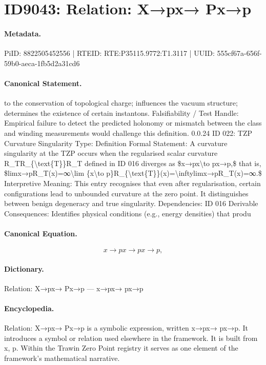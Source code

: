 \section*{ID9043: Relation: X→px→ Px→p}
\paragraph{Metadata.}
PiID: 8822505452556 | RTEID: RTE:P35115.9772:T1.3117 | UUID: 555cf67a-656f-59b0-aeca-1fb5d2a31cd6

\paragraph{Canonical Statement.}
to the conservation of topological charge; influences the vacuum structure; determines the existence of certain instantons. Falsifiability / Test Handle: Empirical failure to detect the predicted holonomy or mismatch between the class and winding measurements would challenge this definition. 0.0.24 ID 022: TZP Curvature Singularity Type: Definition Formal Statement: A curvature singularity at the TZP occurs when the regularised scalar curvature R\_TR\_\{\textbackslash{}text\{T\}\}R\_T defined in ID 016 diverges as \$x→px\textbackslash{}to px→p,\$ that is, \$limx→pR\_T(x)=∞\textbackslash{}lim \{x\textbackslash{}to p\}R\_\{\textbackslash{}text\{T\}\}(x)=\textbackslash{}inftylimx→pR\_T(x)=∞.\$ Interpretive Meaning: This entry recognises that even after regularisation, certain configurations lead to unbounded curvature at the zero point. It distinguishes between benign degeneracy and true singularity. Dependencies: ID 016 Derivable Consequences: Identifies physical conditions (e.g., energy densities) that produ

\paragraph{Canonical Equation.}
\[
x→px\to px→p,
\]

\paragraph{Dictionary.}
Relation: X→px→ Px→p — x→px→ px→p

\paragraph{Encyclopedia.}
Relation: X→px→ Px→p is a symbolic expression, written x→px→ px→p. It introduces a symbol or relation used elsewhere in the framework. It is built from x, p. Within the Trawin Zero Point registry it serves as one element of the framework's mathematical narrative.

